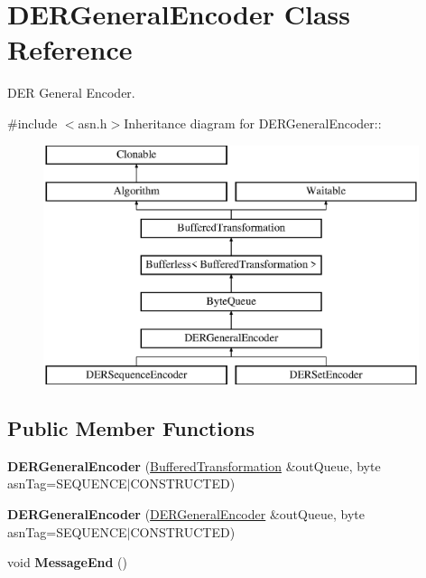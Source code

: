 \hypertarget{class_d_e_r_general_encoder}{
\section{DERGeneralEncoder Class Reference}
\label{class_d_e_r_general_encoder}
}


DER General Encoder.  


{\ttfamily \#include $<$asn.h$>$}Inheritance diagram for DERGeneralEncoder::\begin{figure}[H]
\begin{center}
\leavevmode
\includegraphics[height=7cm]{class_d_e_r_general_encoder}
\end{center}
\end{figure}
\subsection*{Public Member Functions}
\begin{DoxyCompactItemize}
\item 
\hypertarget{class_d_e_r_general_encoder_a7e0b7efea6616097595bc06769e60e73}{
{\bfseries DERGeneralEncoder} (\hyperlink{class_buffered_transformation}{BufferedTransformation} \&outQueue, byte asnTag=SEQUENCE$|$CONSTRUCTED)}
\label{class_d_e_r_general_encoder_a7e0b7efea6616097595bc06769e60e73}

\item 
\hypertarget{class_d_e_r_general_encoder_a572f7ca80b34eaae1355a39d1adfcaa1}{
{\bfseries DERGeneralEncoder} (\hyperlink{class_d_e_r_general_encoder}{DERGeneralEncoder} \&outQueue, byte asnTag=SEQUENCE$|$CONSTRUCTED)}
\label{class_d_e_r_general_encoder_a572f7ca80b34eaae1355a39d1adfcaa1}

\item 
\hypertarget{class_d_e_r_general_encoder_acb5f1a94ba97027c603b019bd5228510}{
void {\bfseries MessageEnd} ()}
\label{class_d_e_r_general_encoder_acb5f1a94ba97027c603b019bd5228510}

\end{DoxyCompactItemize}



